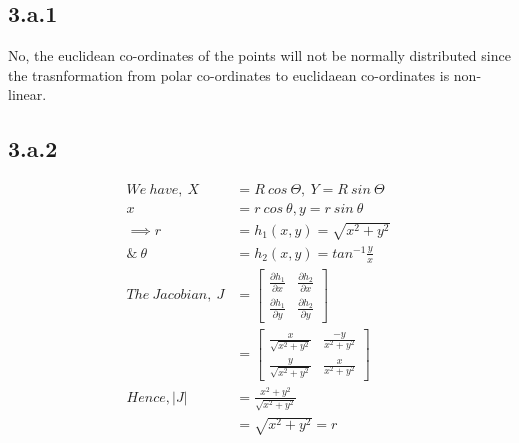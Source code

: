 \documentclass[a4paper,fleqn,11pt]{article}
\theoremstyle{mytheor}
\begin{document}
\section{}

\subsection*{3.a.1}
No, the euclidean co-ordinates of the points will not be normally distributed since the trasnformation from polar co-ordinates to euclidaean co-ordinates is non-linear.
\subsection*{3.a.2}

\begin{align*}
We\ have,\ X & = R\ cos\ \Theta,\ Y = R\ sin\ \Theta \\
x & = r\ cos\ \theta, y = r\ sin\ \theta \\
\implies r & = h_1(x, y) =  \sqrt{x^2 + y^2}\ \\
\&\ \theta & = h_2(x, y) = tan^{-1} \frac{y}{x} \\
The\ Jacobian,\ J & = \begin{bmatrix}
							\frac{\partial h_1}{\partial x} & 													\frac{\partial h_2}{\partial x} \\
							\frac{\partial h_1}{\partial y} & 													\frac{\partial h_2}{\partial y}
					   \end{bmatrix} \\
& = \begin{bmatrix}
		\frac{x}{\sqrt{x^2 + y^2}} & \frac{-y}{x^2 + y^2} \\
		\frac{y}{\sqrt{x^2 + y^2}} & \frac{x}{x^2 + y^2}
	\end{bmatrix} \\
Hence, |J| & = \frac{x^2 + y^2}{\sqrt{x^2 + y^2}} \\
				 & = \sqrt{x^2 + y^2} = r
\end{align*}
\end{document}
